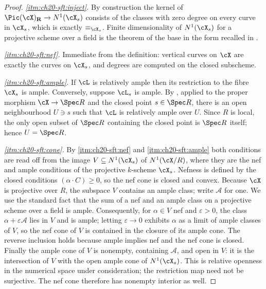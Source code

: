 \begin{proof}
\emph{\cref{itm:ch20-sft:inject}.}  By construction the kernel of
\(\Pic(\cX)_{\mathbf R}\to N^1(\cX_s)\) consists of the classes with zero
degree on every curve in \(\cX_s\), which is exactly \(\equiv_{\cX_s}\).
Finite dimensionality of \(N^1(\cX_s)\) for a projective scheme over a field
is the theorem of the base in the form recalled in
.

\emph{\cref{itm:ch20-sft:nef}.}  Immediate from the definition: vertical
curves on \(\cX\) are exactly the curves on \(\cX_s\), and degrees are
computed on the closed subscheme.

\emph{\cref{itm:ch20-sft:ample}.}  If \(\cL\) is relatively ample then its
restriction to the fibre \(\cX_s\) is ample.  Conversely, suppose
\(\cL_s\) is ample.  By \cite[4.7.1]{EGAIII1}, applied to the proper
morphism \(\cX\to\Spec R\) and the closed point \(s\in\Spec R\), there is an
open neighbourhood \(U\ni s\) such that \(\cL\) is relatively ample over
\(U\).  Since \(R\) is local, the only open subset of \(\Spec R\) containing
the closed point is \(\Spec R\) itself; hence \(U=\Spec R\).

\emph{\cref{itm:ch20-sft:cone}.}  By \cref{itm:ch20-sft:nef} and
\cref{itm:ch20-sft:ample} both conditions are read off from the image
\(V\subseteq N^1(\cX_s)\) of \(N^1(\cX/R)\), where they are the nef and
ample conditions of the projective \(k\)-scheme \(\cX_s\).  Nefness is
defined by the closed conditions \((\alpha\cdot C)\geq0\), so the nef cone
is closed and convex.  Because \(\cX\) is projective over \(R\), the
subspace \(V\) contains an ample class; write \(\mathcal A\) for one.  We
use the standard fact that the sum of a nef and an ample class on a
projective scheme over a field is ample.  Consequently, for \(\alpha\in V\)
nef and \(\varepsilon>0\), the class \(\alpha+\varepsilon\mathcal A\) lies in
\(V\) and is ample; letting \(\varepsilon\to0\) exhibits \(\alpha\) as a
limit of ample classes of \(V\), so the nef cone of \(V\) is contained in the
closure of its ample cone.  The reverse inclusion holds because ample
implies nef and the nef cone is closed.  Finally the ample cone of \(V\) is
nonempty, containing \(\mathcal A\), and open in \(V\): it is the
intersection of \(V\) with the open ample cone of
\(N^1(\cX_s)\).  This is relative openness in the numerical space under
consideration; the restriction map need not be surjective.  The nef cone
therefore has nonempty interior as well.
\end{proof}

